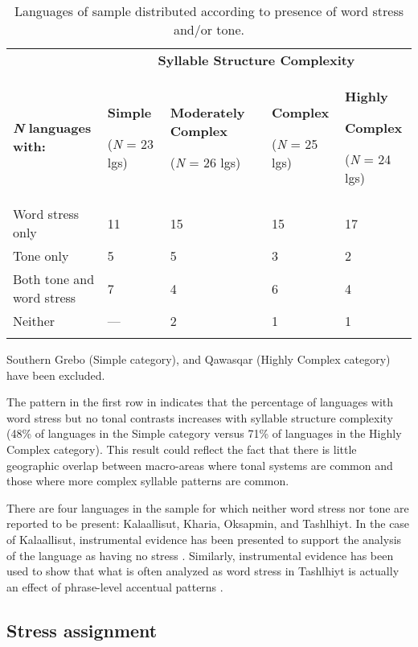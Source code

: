 \begin{table}
\begin{tabularx}{\textwidth}{XXXXX}
\lsptoprule
 & \multicolumn{4}{c}{ \textbf{Syllable Structure Complexity}}\\
 \textbf{\textit{N}} \textbf{languages with:} & { \textbf{Simple}}

 (\textit{N} = 23 lgs) & { \textbf{Moderately Complex}}

 (\textit{N} = 26 lgs) & { \textbf{Complex}}

 (\textit{N} = 25 lgs) & { \textbf{Highly} }

{ \textbf{Complex}}

 (\textit{N} = 24 lgs)\\
 Word stress only & 11 & 15 & 15 & 17\\
 Tone only & 5 & 5 & 3 & 2\\
 Both tone and word stress & 7 & 4 & 6 & 4\\
 Neither & — & 2 & 1 & 1\\
\lspbottomrule
\end{tabularx}
\caption{\label{tab:5.3}Languages of sample distributed according to presence of word stress and/or tone.}Southern Grebo (Simple category), and Qawasqar (Highly Complex category) have been excluded.
\end{table}

  The pattern in the first row in  indicates that the percentage of languages with word stress but no tonal contrasts increases with syllable structure complexity (48\% of languages in the Simple category versus 71\% of languages in the Highly Complex category). This result could reflect the fact that there is little geographic overlap between macro-areas where tonal systems are common and those where more complex syllable patterns are common.

  There are four languages in the sample for which neither word stress nor tone are reported to be present: Kalaallisut, Kharia, Oksapmin, and Tashlhiyt. In the case of Kalaallisut, instrumental evidence has been presented to support the analysis of the language as having no stress \citep{Jacobsen2000}. Similarly, instrumental evidence has been used to show that what is often analyzed as word stress in Tashlhiyt is actually an effect of phrase-level accentual patterns \citep{RoettgerEtAl2015}.

\subsection{Stress assignment}\label{sec:5.4.2}

